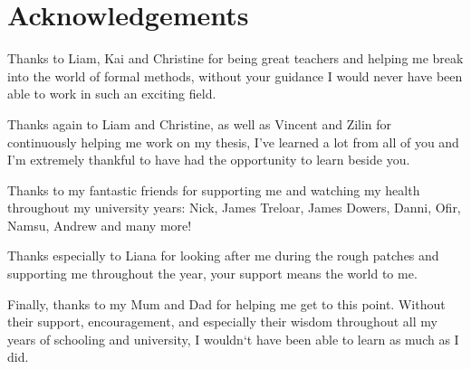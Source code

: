 \chapter*{Acknowledgements}\label{ack}

Thanks to Liam, Kai and Christine for being great teachers and helping me break into the world
of formal methods, without your guidance I would never have been able to work in such an
exciting field.

Thanks again to Liam and Christine, as well as Vincent and Zilin for continuously helping
me work on my thesis, I've learned a lot from all of you and I'm extremely thankful to
have had the opportunity to learn beside you.

Thanks to my fantastic friends for supporting me and watching my health throughout my
university years: Nick, James Treloar, James Dowers, Danni, Ofir, Namsu, Andrew and many more!

Thanks especially to Liana for looking after me during the rough patches and supporting me
throughout the year, your support means the world to me.

Finally, thanks to my Mum and Dad for helping me get to this point. Without their
support, encouragement, and especially their wisdom throughout all my years of schooling and university,
I wouldn`t have been able to learn as much as I did.
